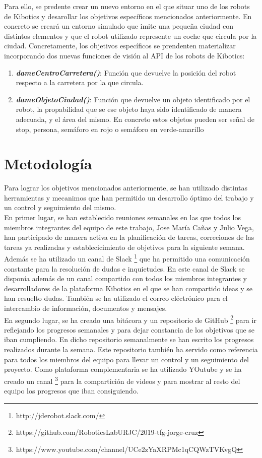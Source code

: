 \documentclass{report}
\begin{document}
Para ello, se predente crear un nuevo entorno en el que situar uno de los robots de Kibotics y desarollar los objetivos específicos mencionados anteriormente. En concreto se creará un entorno simulado que imite una pequeña ciudad con distintos elementos y que el robot utilizado represente un coche que circula por la ciudad. Concretamente, los objetivos específicos se prendenten materializar incorporando dos nuevas funciones de visión al API de los robots de Kibotics:

\begin{enumerate}
\item \textit{\textbf{dameCentroCarretera()}}: Función que devuelve la posición del robot respecto a la carretera por la que circula.
\item \textit{\textbf{ dameObjetoCiudad()}}: Función que devuelve un objeto identificado por el robot, la propabilidad que se ese objeto haya sido identificado de manera adecuada, y el área del mismo. En concreto estos objetos pueden ser señal de stop, persona, semáforo en rojo o semáforo en verde-amarillo
\end{enumerate}

\section{Metodología}
Para lograr los objetivos mencionados anteriormente, se han utilizado distintas herramientas y mecanimos que han permitido un desarrollo óptimo del trabajo y un control y seguimiento del mismo. 
\\

En primer lugar, se han establecido reuniones semanales en las que todos los miembros integrantes del equipo de este trabajo, Jose María Cañas y Julio Vega, han participado de manera activa en la planificación de tareas, correciones de las tareas ya realizadas y establecicimiento de objetivos para la siguiente semana. Además se ha utilizado un canal de Slack \footnote{http://jderobot.slack.com/} que ha permitido una comunicación constante para la resolución de dudas e inquietudes. En este canal de Slack se disponía además de un canal compartido con todos los miembros integrantes y desarrolladores de la plataforma Kibotics en el que se han compartido ideas y se han resuelto dudas. También se ha utilizado el correo eléctrónico para el intercambio de información, documentos y mensajes.
\\

En segundo lugar, se ha creado una bitácora y un repositorio de GitHub \footnote{https://github.com/RoboticsLabURJC/2019-tfg-jorge-cruz} para ir reflejando los progresos semanales y para dejar constancia de los objetivos que se iban cumpliendo. En dicho repositorio semanalmente se han escrito los progresos realizados durante la semana. Este repositorio también ha servido como referencia para todos los miembros del equipo para llevar un control y un seguimiento del proyecto. Como plataforma complementaria se ha utilizado YOutube y se ha creado un canal \footnote{https://www.youtube.com/channel/UCe2zYaXRPMc1qCQWzTVKvgQ} para la compartición de videos y para mostrar al resto del equipo los progresos que iban consiguiendo.
\end{document}
